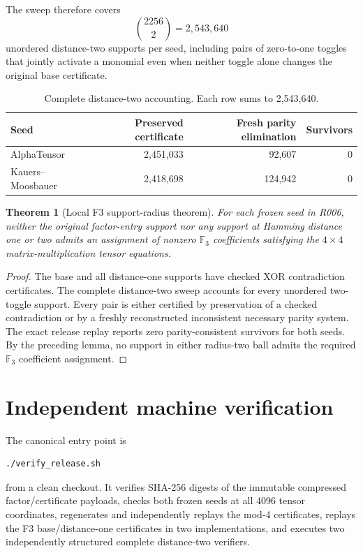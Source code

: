 \documentclass[11pt]{article}
\newtheorem{theorem}{Theorem}
\newcommand{\F}{\mathbb{F}}
\begin{document}
The sweep therefore covers
\[
\binom{2256}{2}=2{,}543{,}640
\]
unordered distance-two supports per seed, including pairs of zero-to-one toggles that jointly activate a monomial even when neither toggle alone changes the original base certificate.

\begin{table}[h]
\centering
\begin{tabular}{lrrr}
\toprule
Seed & Preserved certificate & Fresh parity elimination & Survivors\\
\midrule
AlphaTensor & 2,451,033 & 92,607 & 0\\
Kauers--Moosbauer & 2,418,698 & 124,942 & 0\\
\bottomrule
\end{tabular}
\caption{Complete distance-two accounting. Each row sums to 2,543,640.}
\end{table}

\begin{theorem}[Local F3 support-radius theorem]
For each frozen seed in R006, neither the original factor-entry support nor any support at Hamming distance one or two admits an assignment of nonzero $\F_3$ coefficients satisfying the $4\times4$ matrix-multiplication tensor equations.
\end{theorem}
\begin{proof}
The base and all distance-one supports have checked XOR contradiction certificates. The complete distance-two sweep accounts for every unordered two-toggle support. Every pair is either certified by preservation of a checked contradiction or by a freshly reconstructed inconsistent necessary parity system. The exact release replay reports zero parity-consistent survivors for both seeds. By the preceding lemma, no support in either radius-two ball admits the required $\F_3$ coefficient assignment.
\end{proof}

\section{Independent machine verification}

The canonical entry point is
\begin{verbatim}
./verify_release.sh
\end{verbatim}
from a clean checkout. It verifies SHA-256 digests of the immutable compressed factor/certificate payloads, checks both frozen seeds at all 4096 tensor coordinates, regenerates and independently replays the mod-4 certificates, replays the F3 base/distance-one certificates in two implementations, and executes two independently structured complete distance-two verifiers.
\end{document}
